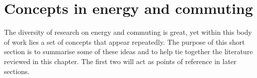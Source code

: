 \section{Concepts in energy and commuting} \label{skeyconcepts}
The diversity of research on energy and commuting is great, yet within this
body of work lies a set of concepts that appear repeatedly. The purpose of
this short section is to summarise some of these ideas
and to help tie together the literature reviewed in this chapter.
The first two will act as points of reference in later sections.
